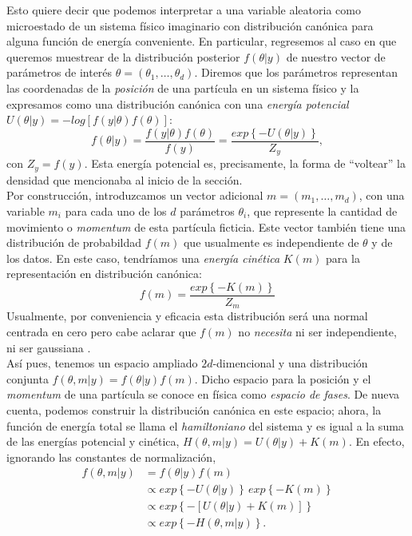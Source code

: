  Esto quiere decir que podemos interpretar a una variable aleatoria como microestado de un sistema físico imaginario con distribución canónica para alguna función de energía conveniente. En particular, regresemos al caso en que queremos muestrear de la distribución posterior $f(\theta|y)$ de nuestro vector de parámetros de interés $\theta = (\theta_1,\dots,\theta_d)$. Diremos que los parámetros representan las coordenadas de la \textit{posición} de una partícula en un sistema físico y la expresamos como una distribución canónica con una \textit{energía potencial} $U(\theta|y) = -log\left[f(y|\theta)f(\theta)\right]$: 
\begin{equation*}
 f(\theta|y)=\dfrac{f(y|\theta)f(\theta)}{f(y)}=\dfrac{exp\left\lbrace -U(\theta|y)\right\rbrace}{Z_y},
\end{equation*} 
con $Z_y = f(y)$. Esta energía potencial es, precisamente, la forma de ``voltear'' la densidad que mencionaba al inicio de la sección.\\
 
 Por construcción, introduzcamos un vector adicional $m = (m_1,\dots,m_d)$, con una variable $m_i$ para cada uno de los $d$ parámetros $\theta_i$, que represente la cantidad de movimiento o \textit{momentum} de esta partícula ficticia. Este vector también tiene una distribución de probabildad $f(m)$ que usualmente es independiente de $\theta$ y de los datos. En este caso, tendríamos una \textit{energía cinética} $K(m)$ para la representación en distribución canónica: 
 \begin{equation*}
f(m)=\dfrac{exp\left\lbrace -K(m)\right\rbrace}{Z_m}
 \end{equation*} 
 Usualmente, por conveniencia y eficacia esta distribución será una normal centrada en cero pero cabe aclarar que $f(m)$ no \textit{necesita} ni ser independiente, ni ser gaussiana \parencite{Betancourt17}.\\
 
 Así pues, tenemos un espacio ampliado $2d$-dimencional y una distribución conjunta $f(\theta,m|y)=f(\theta|y)f(m)$. Dicho espacio para la posición y el \textit{momentum} de una partícula se conoce en física como \textit{espacio de fases}. De nueva cuenta, podemos construir la distribución canónica en este espacio; ahora, la función de energía total se llama el \textit{hamiltoniano} del sistema y es igual a la suma de las energías potencial y cinética, $H(\theta,m|y) = U(\theta|y) + K(m)$. En efecto, ignorando las constantes de normalización, 
 \begin{align*}
 f(\theta,m|y)&=f(\theta|y)f(m)\\
 &\propto exp\left\lbrace -U(\theta|y)\right\rbrace \, exp\left\lbrace -K(m)\right\rbrace\\
 &\propto exp\left\lbrace -\left[ U(\theta|y) + K(m)\right]\right\rbrace\\
 &\propto exp\left\lbrace -H(\theta,m|y)\right\rbrace.
 \end{align*}
 
